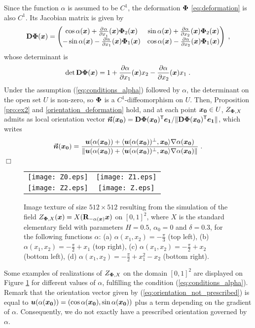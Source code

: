 \documentclass{elsarticle}
\newenvironment{proof}{\medskip\noindent{\bf Proof.}\;}{\null\hfill $\Box$\par\medskip }
\begin{document}
\begin{proof}Since the function $\alpha$ is assumed to be $C^1$, the deformation $\mathbf{\Phi}$ \eqref{eq:deformation} is also $C^1$. Its Jacobian matrix is given by
\[
\ope{D}\ope{\Phi}(\vect{x})=\begin{pmatrix}\cos \alpha(\vect{x})+\pd{\alpha}{x_1}(\vect{x})\ope{\Phi}_2(\vect{x}) & \sin \alpha(\vect{x})+\frac{\partial \alpha}{\partial x_2}(\vect{x})\ope{\Phi}_2(\vect{x}) \\ -\sin \alpha(\vect{x})-\frac{\partial \alpha}{\partial x_1}(\vect{x})\ope{\Phi}_1(\vect{x}) & \cos \alpha(\vect{x})-\frac{\partial \alpha}{\partial x_2}(\vect{x})\ope{\Phi}_1(\vect{x})\end{pmatrix}\;,
\]
whose determinant is
\[
\mathrm{det}\,\mathbf{D}\mathbf{\Phi}(\bm{x})=1+\frac{\partial \alpha}{\partial x_1}(\bm{x})x_2-\frac{\partial \alpha}{\partial x_2}(\bm{x})x_1\;.
\]
Under the assumption (\ref{eq:conditions_alpha}) followed by $\alpha$, the determinant on the open set $U$ is non-zero, so $\mathbf{\Phi}$ is a $C^1$-diffeomorphism on $U$. Then, Proposition \ref{pro:ex2} and \ref{orientation_deformation} hold, and at each point $\bm{x_0}\in U$, $Z_{\mathbf{\Phi},X}$ admits as local orientation vector $\bm{\vec n}(\bm{x_0})=\mathbf{D}\mathbf{\Phi}(\bm{x_0})^{\mathsf{T}}\bm{e_1}/\|\mathbf{D}\mathbf{\Phi}(\bm{x_0})^{\mathsf{T}}\bm{e_1}\|$, which writes
\[
\bm{\vec n}(\bm{x_0})=\frac{\bm{u}(\alpha(\bm{x_0}))+\langle \bm{u}(\alpha(\bm{x_0}))^{\perp},\bm{x_0}\rangle \nabla \alpha(\bm{x_0})}{\|\bm{u}(\alpha(\bm{x_0}))+\langle \bm{u}(\alpha(\bm{x_0}))^{\perp},\bm{x_0}\rangle \nabla \alpha(\bm{x_0})\|}\;.
\]
\end{proof}

\begin{figure}
\centering
\begin{tabular}{cc}
\texttt{[image: Z0.eps]} & \texttt{[image: Z1.eps]}\\
\texttt{[image: Z2.eps]} & \texttt{[image: Z.eps]}
\end{tabular}
\caption{Image texture of size $512\times 512$ resulting from the simulation of the field $Z_{\mathbf{\Phi},X}(\bm{x})=X(\mathbf{R}_{-\alpha(\bm{x})}\bm{x})$ on $[0,1]^2$, where $X$ is the standard elementary field with parameters $H=0.5$, $\alpha_0=0$ and $\delta=0.3$, for the following functions $\alpha$: (a) $\alpha(x_1,x_2)=-\frac \pi 3$ (top left), (b) $\alpha(x_1,x_2)=-\frac \pi 2+x_1$ (top right), (c) $\alpha(x_1,x_2)=-\frac \pi 2+x_2$ (bottom left), (d)  $\alpha(x_1,x_2)=-\frac \pi 2+x_1^2-x_2$ (bottom right).}
\label{fig:Z_simu}
\end{figure}
Some examples of realizations of $Z_{\mathbf{\Phi},X}$ on the domain $[0,1]^2$ are displayed on Figure \ref{fig:Z_simu} for different values of $\alpha$, fulfilling the condition (\ref{eq:conditions_alpha}). Remark that the orientation vector given by (\ref{eq:orientation_not_prescribed}) is equal to $\bm{u}(\alpha(\bm{x_0}))=(\cos \alpha(\bm{x_0}),\sin \alpha(\bm{x_0}))$ plus a term depending on the gradient of $\alpha$. Consequently, we do not exactly have a prescribed orientation governed by $\alpha$. 
\end{document}
